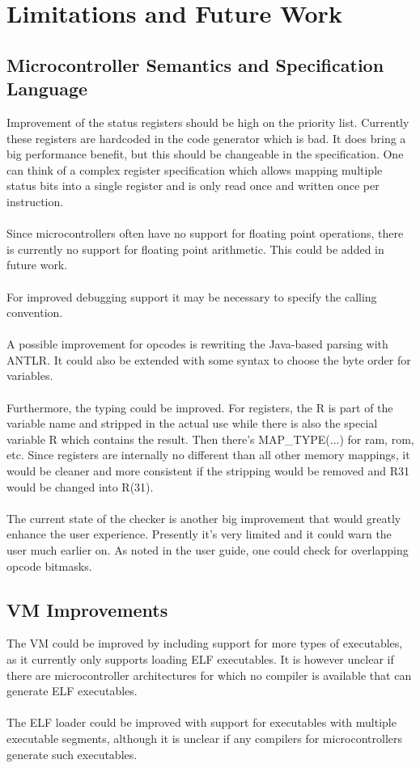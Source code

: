 \chapter{Limitations and Future Work}

\section{Microcontroller Semantics and Specification Language}
Improvement of the status registers should be high on the priority list.
Currently these registers are hardcoded in the code generator which is bad. It
does bring a big performance benefit, but this should be changeable in the
specification. One can think of a complex register specification which allows
mapping multiple status bits into a single register and is only read once and
written once per instruction.\\
\\
Since microcontrollers often have no support for floating point operations,
there is currently no support for floating point arithmetic. This could be
added in future work.\\
\\
For improved debugging support it may be necessary to specify the calling
convention.\\
\\
A possible improvement for opcodes is rewriting the Java-based parsing with
ANTLR. It could also be extended with some syntax to choose the byte order for
variables.\\
\\
Furthermore, the typing could be improved. For registers, the R is part of the
variable name and stripped in the actual use while there is also the special
variable R which contains the result. Then there's MAP\_TYPE(...) for ram, rom,
etc. Since registers are internally no different than all other memory
mappings, it would be cleaner and more consistent if the stripping would be
removed and R31 would be changed into R(31).\\
\\
The current state of the checker is another big improvement that would greatly
enhance the user experience. Presently it's very limited and it could warn the
user much earlier on. As noted in the user guide, one could check for
overlapping opcode bitmasks.

\section{VM Improvements}
The VM could be improved by including support for more types of executables, as
it currently only supports loading ELF executables. It is however unclear if there are
microcontroller architectures for which no compiler is available that can
generate ELF executables.\\
\\
The ELF loader could be improved with support for executables with multiple 
executable segments, although it is unclear if any compilers for microcontrollers
generate such executables.

